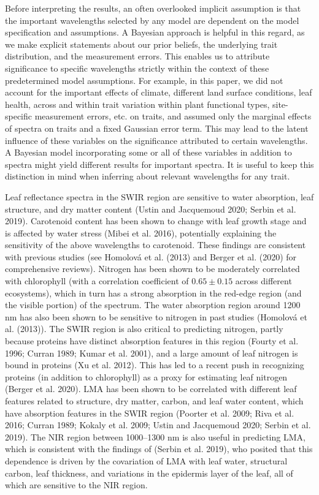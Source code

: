 \documentclass[
  letterpaper,
  DIV=11,
  numbers=noendperiod]{scrartcl}
\begin{document}
Before interpreting the results, an often overlooked implicit assumption
is that the important wavelengths selected by any model are dependent on
the model specification and assumptions. A Bayesian approach is helpful
in this regard, as we make explicit statements about our prior beliefs,
the underlying trait distribution, and the measurement errors. This
enables us to attribute significance to specific wavelengths strictly
within the context of these predetermined model assumptions. For
example, in this paper, we did not account for the important effects of
climate, different land surface conditions, leaf health, across and
within trait variation within plant functional types, site-specific
measurement errors, etc. on traits, and assumed only the marginal
effects of spectra on traits and a fixed Gaussian error term. This may
lead to the latent influence of these variables on the significance
attributed to certain wavelengths. A Bayesian model incorporating some
or all of these variables in addition to spectra might yield different
results for important spectra. It is useful to keep this distinction in
mind when inferring about relevant wavelengths for any trait.

Leaf reflectance spectra in the SWIR region are sensitive to water
absorption, leaf structure, and dry matter content (Ustin and Jacquemoud
2020; Serbin et al. 2019). Carotenoid content has been shown to change
with leaf growth stage and is affected by water stress (Mibei et al.
2016), potentially explaining the sensitivity of the above wavelengths
to carotenoid. These findings are consistent with previous studies (see
Homolová et al. (2013) and Berger et al. (2020) for comprehensive
reviews). Nitrogen has been shown to be moderately correlated with
chlorophyll (with a correlation coefficient of \(0.65 \pm 0.15\) across
different ecosystems), which in turn has a strong absorption in the
red-edge region (and the visible portion) of the spectrum. The water
absorption region around 1200 nm has also been shown to be sensitive to
nitrogen in past studies (Homolová et al. (2013)). The SWIR region is
also critical to predicting nitrogen, partly because proteins have
distinct absorption features in this region (Fourty et al. 1996; Curran
1989; Kumar et al. 2001), and a large amount of leaf nitrogen is bound
in proteins (Xu et al. 2012). This has led to a recent push in
recognizing proteins (in addition to chlorophyll) as a proxy for
estimating leaf nitrogen (Berger et al. 2020). LMA has been shown to be
correlated with different leaf features related to structure, dry
matter, carbon, and leaf water content, which have absorption features
in the SWIR region (Poorter et al. 2009; Riva et al. 2016; Curran 1989;
Kokaly et al. 2009; Ustin and Jacquemoud 2020; Serbin et al. 2019). The
NIR region between 1000--1300 nm is also useful in predicting LMA, which
is consistent with the findings of (Serbin et al. 2019), who posited
that this dependence is driven by the covariation of LMA with leaf
water, structural carbon, leaf thickness, and variations in the
epidermis layer of the leaf, all of which are sensitive to the NIR
region.
\end{document}
